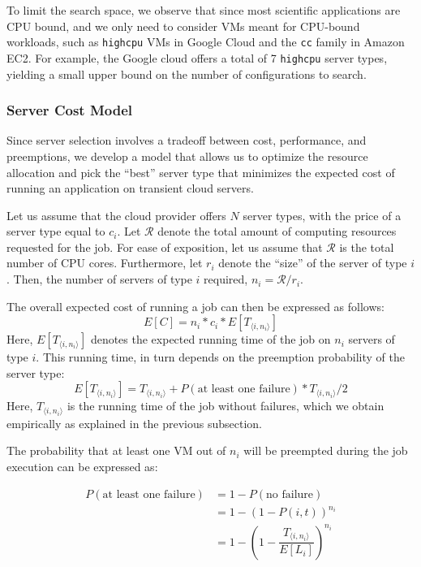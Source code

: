 To limit the search space, we observe that since most scientific applications are CPU bound, and we only need to consider VMs meant for CPU-bound workloads, such as \texttt{highcpu} VMs in Google Cloud and the \texttt{cc} family in Amazon EC2.
For example, the Google cloud offers a total of 7 \texttt{highcpu} server types, yielding a small upper bound on the number of configurations to search.


\subsubsection{Server Cost Model}

Since server selection involves a tradeoff between cost, performance, and preemptions, we develop a model that allows us to optimize the resource allocation and pick the ``best'' server type that minimizes the expected cost of running an application on transient cloud servers. 


Let us assume that the cloud provider offers $N$ server types, with the price of a server type equal to $c_i$. 
Let $\mathcal{R}$ denote the total amount of computing resources requested for the job. For ease of exposition, let us assume that $\mathcal{R}$ is the total number of CPU cores.
Furthermore, let $r_i$ denote the ``size'' of the server of type $i$.
Then, the number of servers of type $i$ required, $n_i = \mathcal{R}/r_i$. 

The overall expected cost of running a job can then be expressed as follows:
\begin{equation}
  \label{eq:e-cost}
  E[C] = n_i*c_i * E[T_{\langle i,n_i \rangle}]
\end{equation}
Here, $E[T_{\langle i,n_i \rangle}]$ denotes the expected running time of the job on $n_i$ servers of type $i$.
This running time, in turn depends on the preemption probability of the server type:
\begin{equation}
  \label{eq:et1}
E[T_{\langle i,n_i \rangle}] = T_{\langle i,n_i \rangle} + P(\text{at least one failure})*T_{\langle i,n_i \rangle}/2   
\end{equation}
Here, $T_{\langle i,n_i \rangle}$ is the running time of the job without failures, which we obtain empirically as explained in the previous subsection.

The probability that at least one VM out of $n_i$ will be preempted during the job execution can be expressed as:

\begin{align}
  \label{eq:pfail1}
  P(\text{at least one failure}) &= 1-P(\text{no failure}) \\
                                 &= 1-(1-P(i, t))^{n_i} \\
                                 &= 1-\left(1-\dfrac{T_{\langle i,n_i \rangle}}{E[L_i]}\right)^{n_i}      
\end{align}

